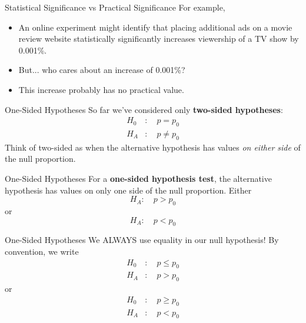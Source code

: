 \begin{frame}{Statistical Significance vs Practical Significance}
    For example, 
    \begin{itemize}
        \item An online experiment might identify that placing additional ads on a movie review website statistically significantly increases viewership of a TV show by 0.001\%.
        \item But... who cares about an increase of 0.001\%?
        \item This increase probably has no practical value.
    \end{itemize}
\end{frame}

\begin{frame}{One-Sided Hypotheses}
    So far we've considered only \textbf{two-sided hypotheses}:
    \begin{align*}
        H_0&: \quad p = p_0 \\
        H_A&: \quad p \ne p_0
    \end{align*}
    Think of two-sided as when the alternative hypothesis has values \textit{on either side} of the null proportion. 
\end{frame}

\begin{frame}{One-Sided Hypotheses}
    For a \textbf{one-sided hypothesis test}, the alternative hypothesis has values on only one side of the null proportion. Either
    \[
        H_A: \quad p > p_0
    \]
    or
    \[
        H_A: \quad p < p_0
    \]
\end{frame}

\begin{frame}{One-Sided Hypotheses}
    We ALWAYS use equality in our null hypothesis! By convention, we write
    \begin{align*}
        H_0&: \quad p \le p_0 \\
        H_A&: \quad p > p_0
    \end{align*}
    or
    \begin{align*}
        H_0&: \quad p \ge p_0 \\
        H_A&: \quad p < p_0
    \end{align*}
\end{frame}


